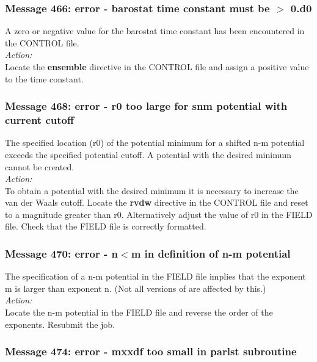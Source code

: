 \subsubsection*{Message 466: error - barostat time constant must be $>$
0.d0}

A zero or negative value for the barostat  time constant has been encountered
in the CONTROL file.\\

\noindent
{\em Action:} \\
Locate the {\bf ensemble} directive in the CONTROL file and assign a
positive value to the time constant. 

\subsubsection*{Message 468: error - r0 too large for snm potential
with current cutoff}

The specified location (r0) of the potential minimum for a shifted n-m
potential exceeds the specified potential cutoff. A potential with the
desired minimum cannot be created. \\

\noindent
{\em Action:} \\
To obtain a potential with the desired minimum it is necessary to
increase the van der Waals cutoff. Locate the {\bf rvdw} directive in
the CONTROL file and reset to a magnitude greater than r0. Alternatively
adjust the value of r0 in the FIELD file. Check that the FIELD file
is correctly formatted.

\subsubsection*{Message 470: error - n$<$m in definition of n-m potential}

The specification of a n-m potential in the FIELD file implies that
the exponent m is larger than exponent n. (Not all versions of \D{} are
affected by this.)\\

\noindent
{\em Action:}\\
Locate the n-m potential in the FIELD file and reverse the order of
the exponents. Resubmit the job.

\subsubsection*{Message 474: error - mxxdf too small in parlst subroutine}

